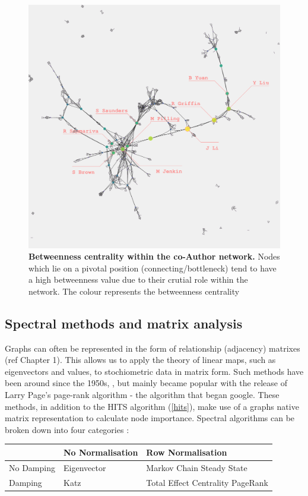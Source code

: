 \begin{figure}[H]
     \centering
         \includegraphics[width=.8\textwidth]{figures_c3/betweenauthor.png}
         
        \caption{ \textbf{Betweenness centrality within the co-Author network.} Nodes which lie on a pivotal position (connecting/bottleneck) tend to have a high betweenness value due to their crutial role within the network. The colour represents the betweenness centrality}
        \label{fig:betauth}
\end{figure}


% 
% 
% 
\subsection{Spectral methods and matrix analysis}

Graphs can often be represented in the form of relationship (adjacency) matrixes (ref Chapter 1). This allows us to apply the theory of linear maps, such as eigenvectors and values, to stochiometric data in matrix form. Such methods have been around since the 1950s, \citep{seeley}, but mainly became popular with the release of Larry Page's page-rank algorithm \citep{google} - the algorithm that began google. These methods, in addition to the HITS algorithm (\autoref{hits}), make use of a graphs native matrix representation to calculate node importance. Spectral algorithms can be broken down into four categories \citep{spectral}:

\begin{table}[H]
  \centering
\begin{tabular}{p{}||p{} p{}}
\hline
 & No Normalisation  & Row Normalisation \\
 \hline \hline
No Damping & Eigenvector \citep{eigen, eigen2}  \: & Markov Chain Steady State \citep{seeley} \: \\
Damping & Katz \citep{katz} \: & Total Effect Centrality PageRank \citep{google} \\ \hline
\end{tabular}
\end{table}


